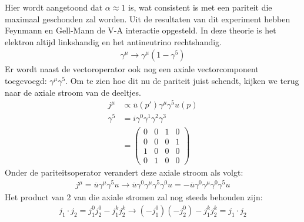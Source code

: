 \documentclass[../main.tex]{subfiles}
\begin{document}
Hier wordt aangetoond dat $\alpha \approx 1$ is, wat consistent is met een pariteit die maximaal geschonden zal worden. Uit de resultaten van dit experiment hebben Feynmann en Gell-Mann de V-A interactie opgesteld. In deze theorie is het elektron altijd linkshandig en het antineutrino rechtshandig.
\begin{equation}
    \begin{aligned}
        \label{eq:v-a_theorie}
        \gamma^\mu \rightarrow \gamma^\mu (1-\gamma^5)
    \end{aligned}
\end{equation}
Er wordt naast de vectoroperator ook nog een axiale vectorcomponent toegevoegd: $\gamma^\mu \gamma^5$. Om te zien hoe dit nu de pariteit juist schendt, kijken we terug naar de axiale stroom van de deeltjes.
\begin{equation}
    \begin{aligned}
        \label{eq:axiale_stroom_v-a}
        j^\mu &\propto \overline u(p')\gamma^\mu\gamma^5u(p)\\
        \gamma^5 &= i\gamma^0\gamma^1\gamma^2\gamma^3\\
                 &=
                 \begin{pmatrix}
                      0&0&1&0\\
                      0&0&0&1\\
                      1&0&0&0\\
                      0&1&0&0
                 \end{pmatrix}
    \end{aligned}
\end{equation}
Onder de pariteitsoperator verandert deze axiale stroom als volgt:
\begin{equation}
    \begin{aligned}
        \label{eq:axiale_stroom_v-a_par}
        j^\mu = \overline u\gamma^\mu\gamma^5u \rightarrow \overline u\gamma^0\gamma^\mu\gamma^5\gamma^0u = -\overline u\gamma^0\gamma^\mu\gamma^0\gamma^5u
    \end{aligned}
\end{equation}
Het product van 2 van die axiale stromen zal nog steeds behouden zijn:
\begin{equation}
    \begin{aligned}
        \label{eq:axiale_stroom_v-a_prod}
        j_1\cdot j_2 = j_1^0j_2^0 - j_1^kj_2^k \rightarrow (-j_1^0)(-j_2^0) - j_1^kj_2^k = j_1\cdot j_2
    \end{aligned}
\end{equation}
\end{document}
